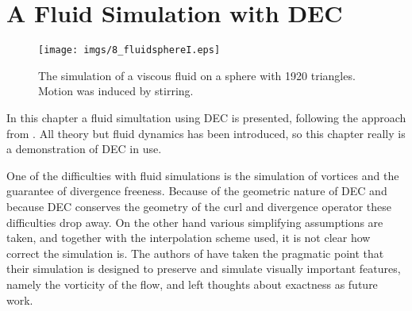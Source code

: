 \chapter{A Fluid Simulation with DEC}

\begin{figure}[h]%
\begin{center}
\texttt{[image: imgs/8\_fluidsphereI.eps]}%
\end{center}
\caption{The simulation of a viscous fluid on a sphere with 1920 triangles. Motion was induced by stirring.}%
\label{fig:8_fluidsphere}%
\end{figure}

In this chapter a fluid simultation using DEC is presented, following the approach from . 
All theory but fluid dynamics has been introduced, so this chapter really is a demonstration of DEC in use. 

One of the difficulties with fluid simulations is the simulation of vortices and the guarantee of  divergence freeness. Because of the geometric nature of DEC and because DEC conserves the geometry of the curl and divergence operator these difficulties drop away. On the other hand various simplifying assumptions are taken, and together with the interpolation scheme used, it is not clear how correct the simulation is. The authors of  have taken the pragmatic point that their simulation is designed to preserve and simulate visually important features, namely the vorticity of the flow, and left thoughts about exactness as future work.

